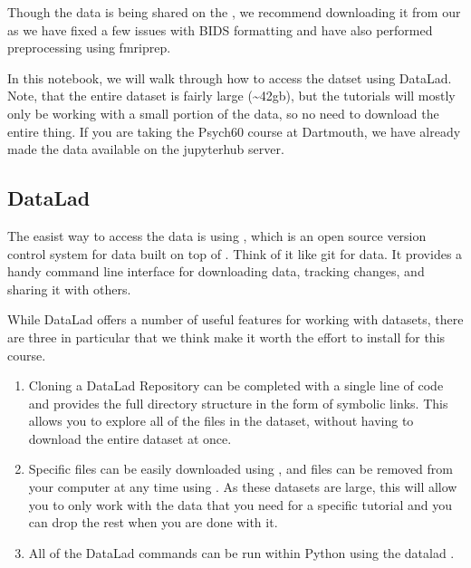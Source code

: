 \documentclass[letterpaper,10pt,english]{sphinxmanual}
\begin{document}
Though the data is being shared on the , we recommend downloading it from our  as we have fixed a few issues with BIDS formatting and have also performed preprocessing using fmriprep.

In this notebook, we will walk through how to access the datset using DataLad. Note, that the entire dataset is fairly large (\textasciitilde{}42gb), but the tutorials will mostly only be working with a small portion of the data, so no need to download the entire thing. If you are taking the Psych60 course at Dartmouth, we have already made the data available on the jupyterhub server.


\subsection{DataLad}
\label{\detokenize{content/Download_Data:datalad}}
The easist way to access the data is using , which is an open source version control system for data built on top of . Think of it like git for data. It provides a handy command line interface for downloading data, tracking changes, and sharing it with others.

While DataLad offers a number of useful features for working with datasets, there are three in particular that we think make it worth the effort to install for this course.
\begin{enumerate}
%
\item {} 
Cloning a DataLad Repository can be completed with a single line of code  and provides the full directory structure in the form of symbolic links. This allows you to explore all of the files in the dataset, without having to download the entire dataset at once.

\item {} 
Specific files can be easily downloaded using , and files can be removed from your computer at any time using . As these datasets are large, this will allow you to only work with the data that you need for a specific tutorial and you can drop the rest when you are done with it.

\item {} 
All of the DataLad commands can be run within Python using the datalad .

\end{enumerate}
\end{document}
